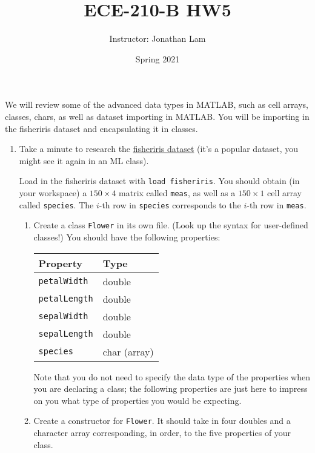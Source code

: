 \documentclass{article}
\title{ECE-210-B HW5}
\author{Instructor: Jonathan Lam}
\date{Spring 2021}
\begin{document}
	\maketitle
	
	\noindent We will review some of the advanced data types in MATLAB, such as cell arrays, classes, chars, as well as dataset importing in MATLAB. You will be importing in the fisheriris dataset and encapsulating it in classes.
	
	\begin{enumerate}
		\item Take a minute to research the \href{https://en.wikipedia.org/wiki/Iris_flower_data_set}{fisheriris dataset} (it's a popular dataset, you might see it again in an ML class).
		
		Load in the fisheriris dataset with \lstinline|load fisheriris|. You should obtain (in your workspace) a $150\times 4$ matrix called \lstinline|meas|, as well as a $150\times 1$ cell array called \lstinline|species|. The $i$-th row in \lstinline|species| corresponds to the $i$-th row in \lstinline|meas|.
		
		\begin{enumerate}
			\item Create a class \lstinline|Flower| in its own file. (Look up the syntax for user-defined classes!) You should have the following properties:
			\begin{table}[h]
				\centering
				\begin{tabular}{l|l}
					Property                & Type   \\ \hline
					\lstinline|petalWidth|  & double \\
					\lstinline|petalLength| & double \\
					\lstinline|sepalWidth|  & double \\
					\lstinline|sepalLength| & double \\
					\lstinline|species|     & char (array)
				\end{tabular}
			\end{table}
		
			Note that you do not need to specify the data type of the properties when you are declaring a class; the following properties are just here to impress on you what type of properties you would be expecting.
			
			\item Create a constructor for \lstinline|Flower|. It should take in four doubles and a character array corresponding, in order, to the five properties of your class.
			

\end{enumerate}
\end{enumerate}
\end{document}
